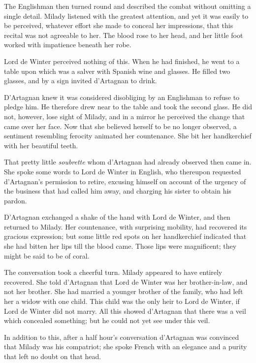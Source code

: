 The Englishman then turned round and described the combat without omitting a single detail. Milady listened with the greatest attention, and yet it was easily to be perceived, whatever effort she made to conceal her impressions, that this recital was not agreeable to her. The blood rose to her head, and her little foot worked with impatience beneath her robe. 

Lord de Winter perceived nothing of this. When he had finished, he went to a table upon which was a salver with Spanish wine and glasses. He filled two glasses, and by a sign invited d'Artagnan to drink. 

D'Artagnan knew it was considered disobliging by an Englishman to refuse to pledge him. He therefore drew near to the table and took the second glass. He did not, however, lose sight of Milady, and in a mirror he perceived the change that came over her face. Now that she believed herself to be no longer observed, a sentiment resembling ferocity animated her countenance. She bit her handkerchief with her beautiful teeth. 

That pretty little \textit{soubrette} whom d'Artagnan had already observed then came in. She spoke some words to Lord de Winter in English, who thereupon requested d'Artagnan's permission to retire, excusing himself on account of the urgency of the business that had called him away, and charging his sister to obtain his pardon. 

D'Artagnan exchanged a shake of the hand with Lord de Winter, and then returned to Milady. Her countenance, with surprising mobility, had recovered its gracious expression; but some little red spots on her handkerchief indicated that she had bitten her lips till the blood came. Those lips were magnificent; they might be said to be of coral. 

The conversation took a cheerful turn. Milady appeared to have entirely recovered. She told d'Artagnan that Lord de Winter was her brother-in-law, and not her brother. She had married a younger brother of the family, who had left her a widow with one child. This child was the only heir to Lord de Winter, if Lord de Winter did not marry. All this showed d'Artagnan that there was a veil which concealed something; but he could not yet see under this veil. 

In addition to this, after a half hour's conversation d'Artagnan was convinced that Milady was his compatriot; she spoke French with an elegance and a purity that left no doubt on that head. 

